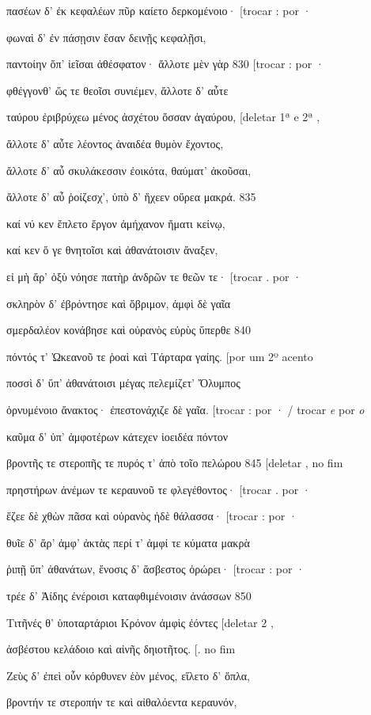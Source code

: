 πασέων δ' ἐκ κεφαλέων πῦρ καίετο δερκομένοιο· {[}trocar : por ·

φωναὶ δ' ἐν πάσῃσιν ἔσαν δεινῇς κεφαλῇσι,

παντοίην ὄπ' ἰεῖσαι ἀθέσφατον· ἄλλοτε μὲν γὰρ 830 {[}trocar : por ·

φθέγγονθ' ὥς τε θεοῖσι συνιέμεν, ἄλλοτε δ' αὖτε

ταύρου ἐριβρύχεω μένος ἀσχέτου ὄσσαν ἀγαύρου, {[}deletar 1ª e 2ª ,

ἄλλοτε δ' αὖτε λέοντος ἀναιδέα θυμὸν ἔχοντος,

ἄλλοτε δ' αὖ σκυλάκεσσιν ἐοικότα, θαύματ' ἀκοῦσαι,

ἄλλοτε δ' αὖ ῥοίζεσχ', ὑπὸ δ' ἤχεεν οὔρεα μακρά. 835

καί νύ κεν ἔπλετο ἔργον ἀμήχανον ἤματι κείνῳ,

καί κεν ὅ γε θνητοῖσι καὶ ἀθανάτοισιν ἄναξεν,

εἰ μὴ ἄρ' ὀξὺ νόησε πατὴρ ἀνδρῶν τε θεῶν τε· {[}trocar . por ·

σκληρὸν δ' ἐβρόντησε καὶ ὄβριμον, ἀμφὶ δὲ γαῖα

σμερδαλέον κονάβησε καὶ οὐρανὸς εὐρὺς ὕπερθε 840

πόντός τ' Ὠκεανοῦ τε ῥοαὶ καὶ Τάρταρα γαίης. {[}por um 2º acento

ποσσὶ δ' ὕπ' ἀθανάτοισι μέγας πελεμίζετ' Ὄλυμπος

ὀρνυμένοιο ἄνακτος· ἐπεστονάχιζε δὲ γαῖα. {[}trocar : por · / trocar
\emph{e} por \emph{o}

καῦμα δ' ὑπ' ἀμφοτέρων κάτεχεν ἰοειδέα πόντον

βροντῆς τε στεροπῆς τε πυρός τ' ἀπὸ τοῖο πελώρου 845 {[}deletar , no fim

πρηστήρων ἀνέμων τε κεραυνοῦ τε φλεγέθοντος· {[}trocar . por ·

ἔζεε δὲ χθὼν πᾶσα καὶ οὐρανὸς ἠδὲ θάλασσα· {[}trocar : por ·

θυῖε δ' ἄρ' ἀμφ' ἀκτὰς περί τ' ἀμφί τε κύματα μακρὰ

ῥιπῇ ὕπ' ἀθανάτων, ἔνοσις δ' ἄσβεστος ὀρώρει· {[}trocar : por ·

τρέε δ' Ἀίδης ἐνέροισι καταφθιμένοισιν ἀνάσσων 850

Τιτῆνές θ' ὑποταρτάριοι Κρόνον ἀμφὶς ἐόντες {[}deletar 2 ,

ἀσβέστου κελάδοιο καὶ αἰνῆς δηιοτῆτος. {[}. no fim

Ζεὺς δ' ἐπεὶ οὖν κόρθυνεν ἑὸν μένος, εἵλετο δ' ὅπλα,

βροντήν τε στεροπήν τε καὶ αἰθαλόεντα κεραυνόν,

